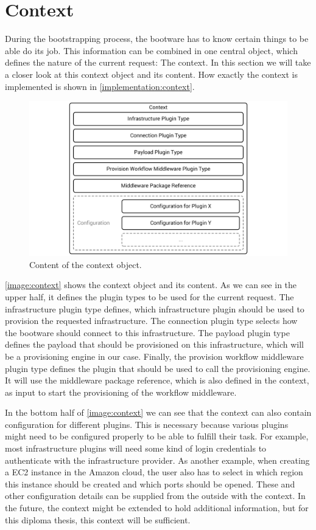 \section{Context}
\label{design:context}

During the bootstrapping process, the bootware has to know certain things to be able do its job.
This information can be combined in one central object, which defines the nature of the current request: The context.
In this section we will take a closer look at this context object and its content.
How exactly the context is implemented is shown in \autoref{implementation:context}.

\begin{figure}[!htbp]
	\centering
	\includegraphics[resolution=600]{design/assets/context}
	\caption{Content of the context object.}
	\label{image:context}
\end{figure}

\autoref{image:context} shows the context object and its content.
As we can see in the upper half, it defines the plugin types to be used for the current request.
The infrastructure plugin type defines, which infrastructure plugin should be used to provision the requested infrastructure.
The connection plugin type selects how the bootware should connect to this infrastructure.
The payload plugin type defines the payload that should be provisioned on this infrastructure, which will be a provisioning engine in our case.
Finally, the provision workflow middleware plugin type defines the plugin that should be used to call the provisioning engine.
It will use the middleware package reference, which is also defined in the context, as input to start the provisioning of the workflow middleware.

In the bottom half of \autoref{image:context} we can see that the context can also contain configuration for different plugins.
This is necessary because various plugins might need to be configured properly to be able to fulfill their task.
For example, most infrastructure plugins will need some kind of login credentials to authenticate with the infrastructure provider.
As another example, when creating a EC2 instance in the Amazon cloud, the user also has to select in which region this instance should be created and which ports should be opened.
These and other configuration details can be supplied from the outside with the context.
In the future, the context might be extended to hold additional information, but for this diploma thesis, this context will be sufficient.

